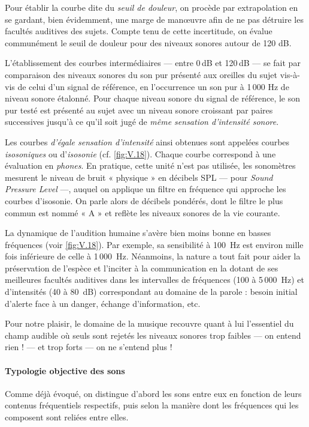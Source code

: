 Pour établir la courbe dite du \emph{seuil de douleur}, on procède par extrapolation en se gardant, bien évidemment, une marge de manœuvre afin de ne pas détruire les facultés auditives des sujets. Compte tenu de cette incertitude, on évalue communément le seuil de douleur pour des niveaux sonores autour de 120 dB.

L'établissement des courbes intermédiaires --- entre 0\,dB et 120\,dB --- se fait par comparaison des niveaux sonores du son pur présenté aux oreilles du sujet vis-à-vis de celui d'un signal de référence, en l’occurrence un son pur à 1\,000 Hz de niveau sonore étalonné. 
Pour chaque niveau sonore du signal de référence, le son pur testé est présenté au sujet avec un niveau sonore croissant par paires successives jusqu'à ce qu'il soit jugé de \emph{même sensation d'intensité sonore}. 

Les courbes \emph{d'égale sensation d'intensité} ainsi obtenues sont appelées courbes \emph{isosoniques} ou d'\emph{isosonie} (cf. \cref{fig:V.18}). Chaque courbe correspond à une évaluation en \emph{phones}. En pratique, cette unité n'est pas utilisée, les sonomètres mesurent le niveau de bruit « physique » en décibels SPL --- pour \textit{Sound Pressure Level} ---, auquel on applique un filtre en fréquence qui approche les courbes d'isosonie. On parle alors de décibels pondérés, dont le filtre le plus commun est nommé « A » et reflète les niveaux sonores de la vie courante. 

La dynamique de l'audition humaine s'avère bien moins bonne en basses fréquences (voir \cref{fig:V.18}). Par exemple, sa sensibilité à 100~Hz est environ mille fois inférieure de celle à 1\,000~Hz. Néanmoins, la nature a tout fait pour aider la préservation de l'espèce et l'inciter à la communication en la dotant de ses meilleures facultés auditives dans les intervalles de fréquences (100 à 5\,000~Hz) et d'intensités (40 à 80~dB) correspondant au domaine de la parole : besoin initial d'alerte face à un danger, échange d'information, etc. 

Pour notre plaisir, le domaine de la musique recouvre quant à lui l'essentiel du champ audible où seuls sont rejetés
les niveaux sonores trop faibles --- on entend rien ! --- et trop forts --- on ne s'entend plus !


\paragraph{Typologie objective des sons} Comme déjà évoqué, on distingue d'abord les sons entre eux en fonction de leurs contenus fréquentiels respectifs, puis selon la manière dont les fréquences qui les composent sont reliées entre elles.

